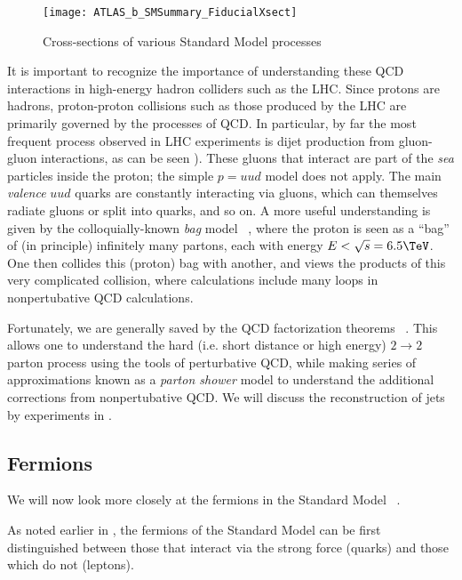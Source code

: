 \begin{sidewaysfigure}[htbp]
\caption{Cross-sections of various Standard Model processes}
\label{fig:sm_xsec}
\texttt{[image: ATLAS\_b\_SMSummary\_FiducialXsect]}
\end{sidewaysfigure}

It is important to recognize the importance of understanding these QCD interactions in high-energy hadron colliders such as the LHC.
Since protons are hadrons, proton-proton collisions such as those produced by the LHC are primarily governed by the processes of QCD.
In particular, by far the most frequent process observed in LHC experiments is dijet production from gluon-gluon interactions, as can be seen ).
These gluons that interact are part of the \textit{sea} particles inside the proton; the simple $p = uud$ model does not apply.
The main \textit{valence} $uud$ quarks are constantly interacting via gluons, which can themselves radiate gluons or split into quarks, and so on.
A more useful understanding is given by the colloquially-known \textit{bag} model ~\cite{Chodos:1974je, Chodos:1974pn}, where the proton is seen as a ``bag'' of (in principle) infinitely many partons, each with energy $ E < \sqrt{s} = 6.5 \TeV$.
One then collides this (proton) bag with another, and views the products of this very complicated collision, where calculations include many loops in nonpertubative QCD calculations.

Fortunately, we are generally saved by the QCD factorization theorems ~\cite{Collins:1989gx}.
This allows one to understand the hard (i.e. short distance or high energy) $2 \rightarrow 2$ parton process using the tools of perturbative QCD, while making series of approximations known as a \textit{parton shower} model to understand the additional corrections from nonpertubative QCD.
We will discuss the reconstruction of jets by experiments in .

\subsection{Fermions}

We will now look more closely at the fermions in the Standard Model ~\cite{Agashe:2014kda}.

As noted earlier in , the fermions of the Standard Model can be first distinguished between those that interact via the strong force (quarks) and those which do not (leptons).

